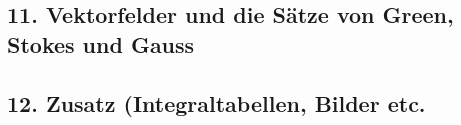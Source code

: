 \subsection{11. Vektorfelder und die 
Sätze von Green, Stokes und Gauss}

\subsection{12. Zusatz (Integraltabellen, Bilder etc.}